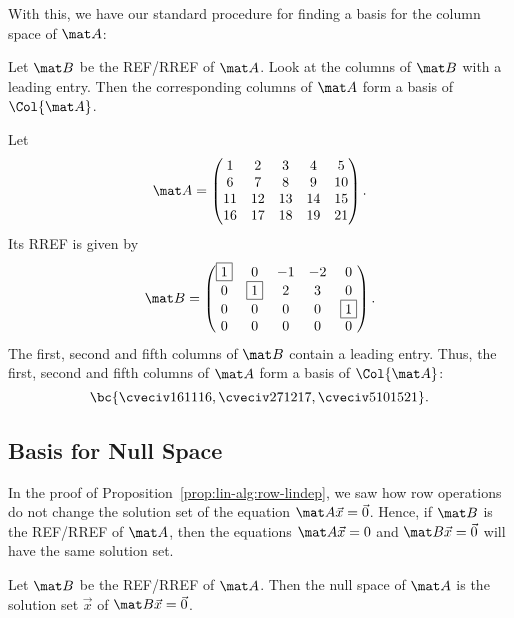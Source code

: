 With this, we have our standard procedure for finding a basis for the column space of $\mat A$:

\begin{recipe}
    Let $\mat B$ be the REF/RREF of $\mat A$. Look at the columns of $\mat B$ with a leading entry. Then the corresponding columns of $\mat A$ form a basis of $\Col{\mat A}$.
\end{recipe}

\begin{example}
    Let \[\mat A = \begin{pmatrix}1 & 2 & 3 & 4 & 5 \\ 6 & 7 & 8 & 9 & 10 \\ 11 & 12 & 13 & 14 & 15 \\ 16 & 17 & 18 & 19 & 21\end{pmatrix}.\] Its RREF is given by \[\mat B = \begin{pmatrix}\boxed{1} & 0 & -1 & -2 & 0 \\ 0 & \boxed{1} & 2 & 3 & 0 \\ 0 & 0 & 0 & 0 & \boxed{1} \\ 0 & 0 & 0 & 0 & 0\end{pmatrix}.\] The first, second and fifth columns of $\mat B$ contain a leading entry. Thus, the first, second and fifth columns of $\mat A$ form a basis of $\Col{\mat A}$: \[\bc{\cveciv16{11}{16}, \cveciv27{12}{17}, \cveciv5{10}{15}{21}}.\]
\end{example}

\subsection{Basis for Null Space}

In the proof of Proposition~\ref{prop:lin-alg:row-lindep}, we saw how row operations do not change the solution set of the equation $\mat A \vec x = \vec 0$. Hence, if $\mat B$ is the REF/RREF of $\mat A$, then the equations $\mat A \vec x = 0$ and $\mat B \vec x = \vec 0$ will have the same solution set. 

\begin{recipe}
    Let $\mat B$ be the REF/RREF of $\mat A$. Then the null space of $\mat A$ is the solution set $\vec x$ of $\mat B \vec x = \vec 0$.
\end{recipe}

